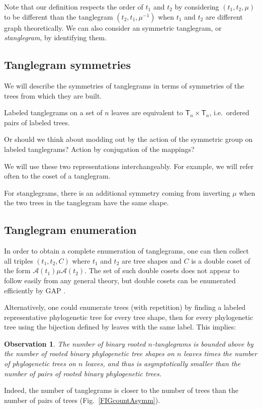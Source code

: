 \documentclass{amsart}
\newtheorem{observation}{Observation}
\newcommand{\aut}{\mathcal A}
\newcommand{\pairing}{\mu}
\newcommand{\tree}{\mathsf{T}}
\begin{document}
Note that our definition respects the order of $t_1$ and $t_2$ by considering $(t_1, t_2, \pairing)$ to be different than the tanglegram $(t_2, t_1, \pairing^{-1})$ when $t_1$ and $t_2$ are different graph theoretically.
We can also consider an symmetric tanglegram, or \emph{stanglegram}, by identifying them.


\subsection{Tanglegram symmetries}
We will describe the symmetries of tanglegrams in terms of symmetries of the trees from which they are built.

Labeled tanglegrams on a set of $n$ leaves are equivalent to $\tree_n \times \tree_n$, i.e.\ ordered pairs of labeled trees.

Or should we think about modding out by the action of the symmetric group on labeled tanglegrams?
Action by conjugation of the mappings?


We will use these two representations interchangeably.
For example, we will refer often to the coset of a tanglegram.

For stanglegrams, there is an additional symmetry coming from inverting $\pairing$ when the two trees in the tanglegram have the same shape.


\subsection{Tanglegram enumeration}
In order to obtain a complete enumeration of tanglegrams, one can then collect all triples $(t_1, t_2, C)$ where $t_1$ and $t_2$ are tree shapes and $C$ is a double coset of the form $\aut(t_1) \pairing \aut(t_2)$.
The set of such double cosets does not appear to follow easily from any general theory, but double cosets can be enumerated efficiently by GAP \cite{GAP4}.

Alternatively, one could enumerate trees (with repetition) by finding a labeled representative phylogenetic tree for every tree shape, then for every phylogenetic tree using the bijection defined by leaves with the same label.
This implies:
\begin{observation}
\label{obs:count}
The number of binary rooted $n$-tanglegrams is bounded above by the number of rooted binary phylogenetic tree shapes on $n$ leaves times the number of phylogenetic trees on $n$ leaves, and thus is asymptotically smaller than the number of pairs of rooted binary phylogenetic trees.
\end{observation}
Indeed, the number of tanglegrams is closer to the number of trees than the number of pairs of trees (Fig.~\ref{FIGcountAsymm}).
\end{document}
